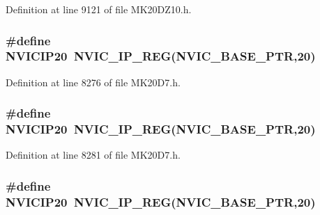 Definition at line 9121 of file M\+K20\+D\+Z10.\+h.

\subsubsection[{\texorpdfstring{N\+V\+I\+C\+I\+P20}{NVICIP20}}]{\setlength{\rightskip}{0pt plus 5cm}\#define N\+V\+I\+C\+I\+P20~{\bf N\+V\+I\+C\+\_\+\+I\+P\+\_\+\+R\+EG}({\bf N\+V\+I\+C\+\_\+\+B\+A\+S\+E\+\_\+\+P\+TR},20)}\hypertarget{group___n_v_i_c___register___accessor___macros_gaa68a8ed9ef4997a0991dd7fd8cf6e4d0}{}\label{group___n_v_i_c___register___accessor___macros_gaa68a8ed9ef4997a0991dd7fd8cf6e4d0}


Definition at line 8276 of file M\+K20\+D7.\+h.

\subsubsection[{\texorpdfstring{N\+V\+I\+C\+I\+P20}{NVICIP20}}]{\setlength{\rightskip}{0pt plus 5cm}\#define N\+V\+I\+C\+I\+P20~{\bf N\+V\+I\+C\+\_\+\+I\+P\+\_\+\+R\+EG}({\bf N\+V\+I\+C\+\_\+\+B\+A\+S\+E\+\_\+\+P\+TR},20)}\hypertarget{group___n_v_i_c___register___accessor___macros_gaa68a8ed9ef4997a0991dd7fd8cf6e4d0}{}\label{group___n_v_i_c___register___accessor___macros_gaa68a8ed9ef4997a0991dd7fd8cf6e4d0}


Definition at line 8281 of file M\+K20\+D7.\+h.

\subsubsection[{\texorpdfstring{N\+V\+I\+C\+I\+P20}{NVICIP20}}]{\setlength{\rightskip}{0pt plus 5cm}\#define N\+V\+I\+C\+I\+P20~{\bf N\+V\+I\+C\+\_\+\+I\+P\+\_\+\+R\+EG}({\bf N\+V\+I\+C\+\_\+\+B\+A\+S\+E\+\_\+\+P\+TR},20)}\hypertarget{group___n_v_i_c___register___accessor___macros_gaa68a8ed9ef4997a0991dd7fd8cf6e4d0}{}\label{group___n_v_i_c___register___accessor___macros_gaa68a8ed9ef4997a0991dd7fd8cf6e4d0}


